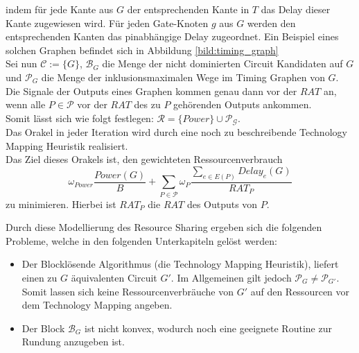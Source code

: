 \documentclass[11pt, a4paper, german]{article}
\newcommand{\TM}{Technology  Mapping }
\begin{document}
indem für jede Kante aus $G$ der entsprechenden Kante in $T$ das Delay dieser Kante zugewiesen wird. 
Für jeden Gate-Knoten $g$ aus $G$ werden den entsprechenden Kanten das pinabhängige Delay zugeordnet. Ein Beispiel eines solchen Graphen befindet sich in Abbildung \ref{bild:timing_graph}\\
Sei nun $\mathcal{C} := \{G\} $, $\mathcal{B}_G$ die Menge der nicht dominierten Circuit Kandidaten auf $G$ und $\mathcal{P}_G$ die Menge der inklusionsmaximalen Wege im Timing Graphen von $G$. Die Signale der Outputs eines Graphen kommen genau dann vor der $RAT$ an, wenn  alle $P \in \mathcal{P}$  vor der $RAT$ des zu $P$ gehörenden Outputs ankommen.\\
Somit lässt sich wie folgt festlegen: $\mathcal{R} = \{Power\} \cup \mathcal{P_G}$. \\
Das Orakel in jeder Iteration wird durch eine noch zu beschreibende \TM Heuristik realisiert. \\
Das Ziel dieses Orakels ist, den gewichteten Ressourcenverbrauch
\begin{equation}\label{eq:ressourcen_verbrauch_1}
\omega _{Power} \frac{Power(G)}{B} + \sum\limits_{P \in \mathcal{P}} \omega _P \frac{\sum_{e \in E(P)}Delay_e(G)}{RAT_P}
\end{equation}
 zu minimieren. Hierbei ist $RAT_P$ die $RAT$ des Outputs von $P$.

Durch diese Modellierung des Resource Sharing ergeben sich die folgenden Probleme, welche in den folgenden Unterkapiteln gelöst werden: \\
\begin{itemize}
	\item Der Blockl\"osende Algorithmus (die \TM Heuristik), liefert einen zu $G$ äquivalenten Circuit $G'$. Im Allgemeinen gilt jedoch $\mathcal{P}_G \neq \mathcal{P}_{G'}$. Somit lassen sich keine Ressourcenverbräuche von $G'$ auf den Ressourcen vor dem \TM angeben.
	\item Der Block $\mathcal{B}_G$ ist nicht konvex, wodurch noch eine geeignete Routine zur Rundung anzugeben ist.
\end{itemize}
\end{document}
